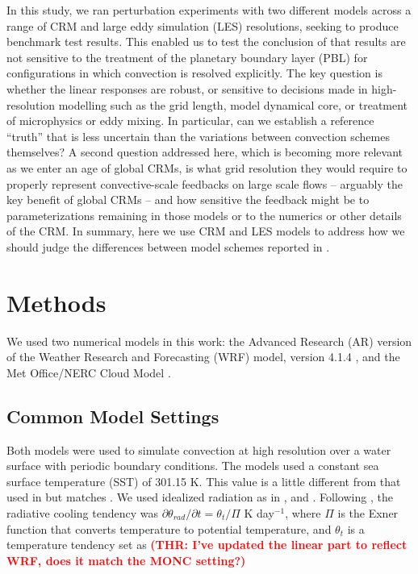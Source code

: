 \documentclass[draft]{agujournal2019}
\newcommand{\todo}[1]{\textcolor{red}{\textbf{(#1)}}}
\begin{document}
In this study, we ran perturbation experiments with two different models across
a range of CRM and large eddy simulation (LES) resolutions, seeking to produce
benchmark test results. This enabled us to test the conclusion of
 that results are not sensitive to the treatment of the
planetary boundary layer (PBL) for configurations in which convection is
resolved explicitly. The key question is whether the linear responses are
robust, or sensitive to decisions made in high-resolution modelling such as the
grid length, model dynamical core, or treatment of microphysics or eddy mixing.
In particular, can we establish a reference ``truth'' that is less uncertain
than the variations between convection schemes themselves? A second question
addressed here, which is becoming more relevant as we enter an age of global
CRMs, is what grid resolution they would require to properly represent
convective-scale feedbacks on large scale flows -- arguably the key benefit of
global CRMs -- and how sensitive the feedback might be to parameterizations
remaining in those models or to the numerics or other details of the CRM. In
summary, here we use CRM and LES models to address how we should judge the
differences between model schemes reported in .

\section{Methods}
\label{sec:methods}

We used two numerical models in this work: the Advanced Research (AR) version of
the Weather Research and Forecasting (WRF) model, version 4.1.4
\cite{Skamarock_2019}, and the Met Office/NERC Cloud Model
\cite<MONC,>{Brown_2020}.

\subsection{Common Model Settings}

Both models were used to simulate convection at high resolution over a water
surface with periodic boundary conditions. The models used a constant sea
surface temperature (SST) of 301.15 K. This value is a little different from
that used in  but matches . We
used idealized radiation as in , 
and . Following , the radiative
cooling tendency was $\partial \theta_{rad} / \partial t = \theta_t/\Pi$ K
day$^{-1}$, where $\Pi$ is the Exner function that converts temperature to
potential temperature, and $\theta_t$ is a temperature tendency set as
\todo{THR: I've updated the linear part to reflect WRF, does it match the MONC
setting?}
\end{document}
